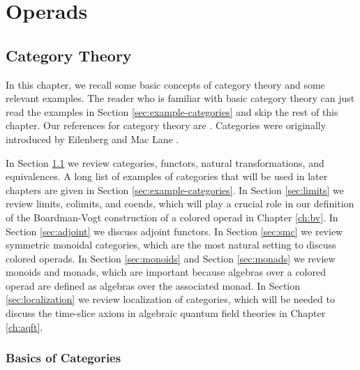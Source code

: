 \documentclass{amsbook}
\numberwithin{section}{chapter}
\numberwithin{subsection}{section}
\numberwithin{equation}{section}
\theoremstyle{plain}
\theoremstyle{definition}
\begin{document}
\part{Operads}\label{part:operads}

\chapter{Category Theory}\label{ch:categories}

In this chapter, we recall some basic concepts of category theory and some relevant examples.  The reader who is familiar with basic category theory can just read the examples in Section \ref{sec:example-categories} and skip the rest of this chapter.  Our references for category theory are \cite{bor1,bor2,maclane}.  Categories were originally introduced by Eilenberg and Mac Lane \cite{eilenberg-maclane}.

In Section \ref{sec:categories} we review categories, functors, natural transformations, and equivalences.  A long list of examples of categories that will be used in later chapters are given in Section \ref{sec:example-categories}.  In Section \ref{sec:limits} we review limits, colimits, and coends, which will play a crucial role in our definition of the Boardman-Vogt construction of a colored operad in Chapter \ref{ch:bv}.  In Section \ref{sec:adjoint} we discuss adjoint functors.  In Section \ref{sec:smc} we review symmetric monoidal categories, which are the most natural setting to discuss colored operads.  In Section \ref{sec:monoids} and Section \ref{sec:monads} we review monoids and monads, which are important because algebras over a colored operad are defined as algebras over the associated monad.  In Section \ref{sec:localization} we review localization of categories, which will be needed to discuss the time-slice axiom in algebraic quantum field theories in Chapter \ref{ch:aqft}.

\section{Basics of Categories}\label{sec:categories}
\end{document}
